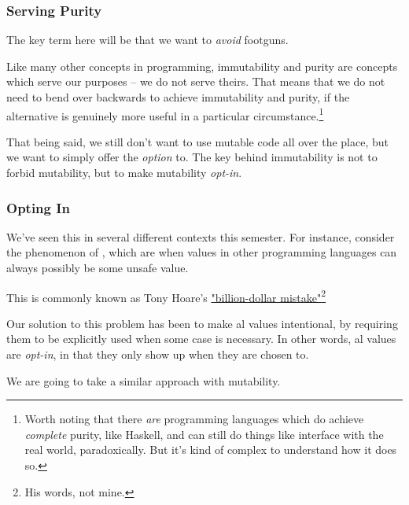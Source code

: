 \documentclass[aspectratio=169, handout]{beamer}
\begin{document}
\begin{frame}[fragile]
  \frametitle{Serving Purity}

  The key term here will be that we want to \textit{avoid} footguns.

  \pause
  \vspace{\fill}

  Like many other concepts in programming, immutability and purity are concepts
  which serve our purposes -- we do not serve theirs. That means that we do
  not need to bend over backwards to achieve immutability and purity, if the
  alternative is genuinely more useful in a particular circumstance.\footnote{Worth
  noting that there \textit{are} programming languages which do achieve \textit{complete}
  purity, like Haskell, and can still do things like interface with the real world,
  paradoxically. But it's kind of complex to understand how it does so.}

  \pause
  \vspace{\fill}

  That being said, we still don't want to use mutable code all over the place, but
  we want to simply offer the \textit{option} to. The key behind immutability is
  not to forbid mutability, but to make mutability \textit{opt-in}.
\end{frame}

\begin{frame}[fragile]
  \frametitle{Opting In}

  We've seen this in several different contexts this semester. For instance, consider
  the phenomenon of , which are when values in other programming
  languages can always possibly be some unsafe  value.

  \pause
  \vspace{\fill}

  This is commonly known as Tony Hoare's
  {\color{blue}\href{https://www.infoq.com/presentations/Null-References-The-Billion-Dollar-Mistake-Tony-Hoare/}{"billion-dollar mistake"}}\footnote{His words, not mine.}

  \pause
  \vspace{\fill}

  Our solution to this problem has been to make al values intentional,
  by requiring them to be explicitly used when some  case is necessary.
  In other words, al values are \textit{opt-in}, in that they only
  show up when they are chosen to.

  \pause
  \vspace{\fill}

  We are going to take a similar approach with mutability.
\end{frame}
\end{document}
